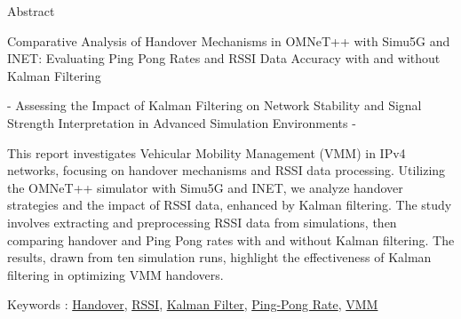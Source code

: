 \thispagestyle{empty}

\noindent
\normalsize	Abstract

\vspace{1cm}

\begin{center}

	\huge
Comparative Analysis of Handover Mechanisms in OMNeT++ with Simu5G and INET: Evaluating Ping Pong Rates and RSSI Data Accuracy with and without Kalman Filtering 

	\vspace{1cm} 

	\large	
	- Assessing the Impact of Kalman Filtering on Network Stability and Signal Strength Interpretation in Advanced Simulation Environments -

	\vspace{2cm} 

\end{center}

\begin{spacing}{0.95} 
This report investigates Vehicular Mobility Management (VMM) in IPv4 networks, focusing on handover mechanisms and RSSI data processing. Utilizing the OMNeT++ simulator with Simu5G and INET, we analyze handover strategies and the impact of RSSI data, enhanced by Kalman filtering. The study involves extracting and preprocessing RSSI data from simulations, then comparing handover and Ping Pong rates with and without Kalman filtering. The results, drawn from ten simulation runs, highlight the effectiveness of Kalman filtering in optimizing VMM handovers.
\end{spacing}

\vspace{2cm} 

\begin{center}
 	\large	
	Keywords : 
	\underline{Handover}, 
	\underline{RSSI}, 
	\underline{Kalman Filter}, 
	\underline{Ping-Pong Rate}, 
	\underline{VMM}
\end{center}

\newpage

